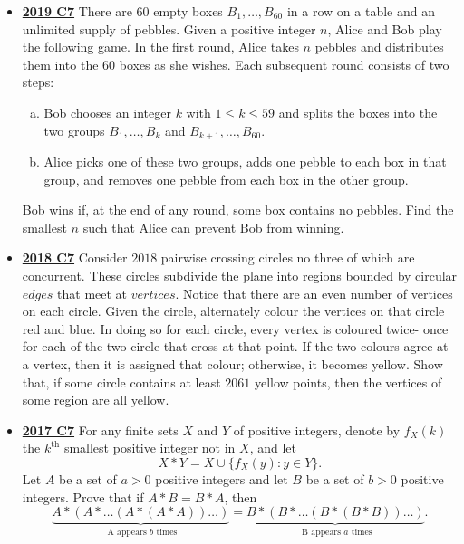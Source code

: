 \documentclass[11pt]{scrartcl}
\begin{document}
\begin{itemize}[leftmargin=*]
A saddle pair $(R, C)$ is called a minimal pair if for each saddle pair $\left(R^{\prime}, C^{\prime}\right)$ with $R^{\prime} \subseteq R$ and $C^{\prime} \subseteq C$, we have $R^{\prime}=R$ and $C^{\prime}=C$. Prove that any two minimal pairs contain the same number of rows.
    \item \href{https://artofproblemsolving.com/community/c6h2278979p17828535}{\textbf{2019 C7}} There are 60 empty boxes $B_1,\dots,B_{60}$ in a row on a table and an unlimited supply of pebbles. Given a positive integer $n$, Alice and Bob play the following game.
In the first round, Alice takes $n$ pebbles and distributes them into the 60 boxes as she wishes. Each subsequent round consists of two steps:
\begin{enumerate}[(a)]
    \item Bob chooses an integer $k$ with $1\leqslant k\leqslant 59$ and splits the boxes into the two groups $B_1,\dots,B_k$ and $B_{k+1},\dots,B_{60}$.
    \item Alice picks one of these two groups, adds one pebble to each box in that group, and removes one pebble from each box in the other group.
\end{enumerate}
Bob wins if, at the end of any round, some box contains no pebbles. Find the smallest $n$ such that Alice can prevent Bob from winning.
    \item \href{https://artofproblemsolving.com/community/c6h1876756p12752807}{\textbf{2018 C7}} Consider $2018$ pairwise crossing circles no three of which are concurrent. These circles subdivide the plane into regions bounded by circular $edges$ that meet at $vertices$. Notice that there are an even number of vertices on each circle. Given the circle, alternately colour the vertices on that circle red and blue. In doing so for each circle, every vertex is coloured twice- once for each of the two circle that cross at that point. If the two colours agree at a vertex, then it is assigned that colour; otherwise, it becomes yellow. Show that, if some circle contains at least $2061$ yellow points, then the vertices of some region are all yellow.
    \item \href{https://artofproblemsolving.com/community/c6h1671320p10632559}{\textbf{2017 C7}} For any finite sets $X$ and $Y$ of positive integers, denote by $f_X(k)$ the $k^{\text{th}}$ smallest positive integer not in $X$, and let$$X*Y=X\cup \{ f_X(y):y\in Y\}.$$Let $A$ be a set of $a>0$ positive integers and let $B$ be a set of $b>0$ positive integers. Prove that if $A*B=B*A$, then$$\underbrace{A*(A*\dots (A*(A*A))\dots )}_{\text{ A appears $b$ times}}=\underbrace{B*(B*\dots (B*(B*B))\dots )}_{\text{ B appears $a$ times}}.$$

\end{itemize}
\end{document}
